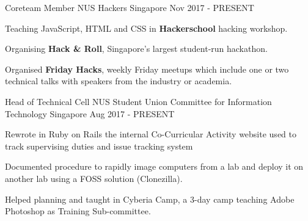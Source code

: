 

\begin{cventries}

 \cventry
    {Coreteam Member} %
    {NUS Hackers} %
    {Singapore} %
    {Nov 2017 - PRESENT} %
    {
      \begin{cvitems} %
        \item {Teaching JavaScript, HTML and CSS in \textbf{Hackerschool} hacking workshop.}
        \item {Organising \textbf{Hack \& Roll}, Singapore's largest student-run hackathon.}
      	\item {Organised \textbf{Friday Hacks}, weekly Friday meetups which include one or two technical talks with speakers from the industry or academia.}
      \end{cvitems}
    }
    
  \cventry
    {Head of Technical Cell} %
    {NUS Student Union Committee for Information Technology} %
    {Singapore} %
    {Aug 2017 - PRESENT} %
    {
      \begin{cvitems} %
	    \item {Rewrote in Ruby on Rails the internal Co-Curricular Activity website used to track supervising duties and issue tracking system}
      	\item {Documented procedure to rapidly image computers from a lab and deploy it on another lab using a FOSS solution (Clonezilla).}
        \item {Helped planning and taught in Cyberia Camp, a 3-day camp teaching Adobe Photoshop as Training Sub-committee.}
      \end{cvitems}
    }
    
\end{cventries}
